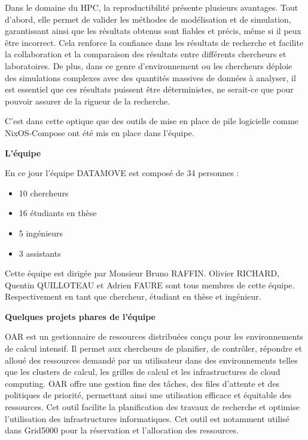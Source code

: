 \documentclass[a4paper,french,12pt, titlepage]{article}
\begin{document}
Dans le domaine du HPC, la reproductibilité présente plusieurs
avantages. Tout d'abord, elle permet de valider les méthodes de
modélisation et de simulation, garantissant ainsi que les résultats
obtenus sont fiables et précis, même si il peux être incorrect. Cela
renforce la confiance dans les résultats de recherche et facilite la
collaboration et la comparaison des résultats entre différents
chercheurs et laboratoires. De plus, dans ce genre d'environnement ou
les chercheurs déploie des simulations complexes avec des quantités
massives de données à analyser, il est essentiel que ces résultats
puissent être déterministes, ne serait-ce que pour pouvoir assurer de la
rigueur de la recherche.\newline

C'est dans cette optique que des outils de mise en place de pile
logicielle comme NixOS-Compose ont été mis en place dans
l'équipe.\newline

\textbf{L'équipe}\newline

En ce jour l'équipe DATAMOVE est composé de 34 personnes :

\begin{itemize}
\item
  10 chercheurs
\item
  16 étudiants en thèse
\item
  5 ingénieurs
\item
  3 assistants\newline
\end{itemize}

Cette équipe est dirigée par Monsieur Bruno RAFFIN. Olivier RICHARD,
Quentin QUILLOTEAU et Adrien FAURE sont tous membres de cette équipe.
Respectivement en tant que chercheur, étudiant en thèse et
ingénieur.\newline

\textbf{Quelques projets phares de l'équipe}\newline

OAR est un gestionnaire de ressources distribuées conçu pour les
environnements de calcul intensif. Il permet aux chercheurs de
planifier, de contrôler, répondre et alloué des ressources demandé par
un utilisateur dans des environnements telles que les clusters de
calcul, les grilles de calcul et les infrastructures de cloud computing.
OAR offre une gestion fine des tâches, des files d'attente et des
politiques de priorité, permettant ainsi une utilisation efficace et
équitable des ressources. Cet outil facilite la planification des
travaux de recherche et optimise l'utilisation des infrastructures
informatiques. Cet outil est notamment utilisé dans Grid5000 pour la
réservation et l'allocation des ressources.\newline
\end{document}
